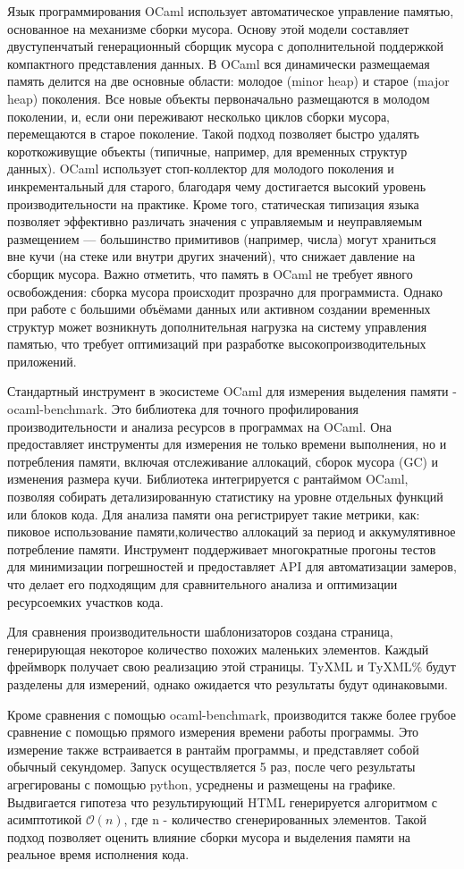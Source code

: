 Язык программирования OCaml использует автоматическое управление памятью, основанное на механизме сборки мусора\cite{ocamlMemoryModel}.
Основу этой модели составляет двуступенчатый генерационный сборщик мусора с дополнительной поддержкой компактного представления данных.
В OCaml вся динамически размещаемая память делится на две основные области: молодое (minor heap) и старое (major heap) поколения\cite{doligez1989realisation}.
Все новые объекты первоначально размещаются в молодом поколении, и, если они переживают несколько циклов сборки мусора, перемещаются в старое поколение.
Такой подход позволяет быстро удалять короткоживущие объекты (типичные, например, для временных структур данных).
OCaml использует стоп-коллектор для молодого поколения и инкрементальный для старого, благодаря чему достигается высокий уровень производительности на практике.
Кроме того, статическая типизация языка позволяет эффективно различать значения с управляемым и неуправляемым размещением — большинство примитивов (например, числа) могут храниться вне кучи (на стеке или внутри других значений), что снижает давление на сборщик мусора.
Важно отметить, что память в OCaml не требует явного освобождения: сборка мусора происходит прозрачно для программиста.
Однако при работе с большими объёмами данных или активном создании временных структур может возникнуть дополнительная нагрузка на систему управления памятью, что требует оптимизаций при разработке высокопроизводительных приложений\cite{allocImpact2019}.

Стандартный инструмент в экосистеме OCaml для измерения выделения памяти - ocaml-benchmark.
Это библиотека для точного профилирования производительности и анализа ресурсов в программах на OCaml.
Она предоставляет инструменты для измерения не только времени выполнения, но и потребления памяти, включая отслеживание аллокаций, сборок мусора (GC) и изменения размера кучи.
Библиотека интегрируется с рантаймом OCaml, позволяя собирать детализированную статистику на уровне отдельных функций или блоков кода.
Для анализа памяти она регистрирует такие метрики, как: пиковое использование памяти,количество аллокаций за период и аккумулятивное потребление памяти.
Инструмент поддерживает многократные прогоны тестов для минимизации погрешностей и предоставляет API для автоматизации замеров, что делает его подходящим для сравнительного анализа и оптимизации ресурсоемких участков кода.

Для сравнения производительности шаблонизаторов создана страница, генерирующая некоторое количество похожих маленьких элементов.
Каждый фреймворк получает свою реализацию этой страницы.
TyXML и TyXML\% будут разделены для измерений, однако ожидается что результаты будут одинаковыми.

Кроме сравнения с помощью ocaml-benchmark, производится также более грубое сравнение с помощью прямого измерения времени работы программы.
Это измерение также встраивается в рантайм программы, и представляет собой обычный секундомер.
Запуск осуществляется 5 раз, после чего результаты агрегированы с помощью python, усреднены и размещены на графике.
Выдвигается гипотеза что результирующий HTML генерируется алгоритмом с асимптотикой $\mathcal{O}(n)$, где n - количество сгенерированных элементов.
Такой подход позволяет оценить влияние сборки мусора и выделения памяти на реальное время исполнения кода.
